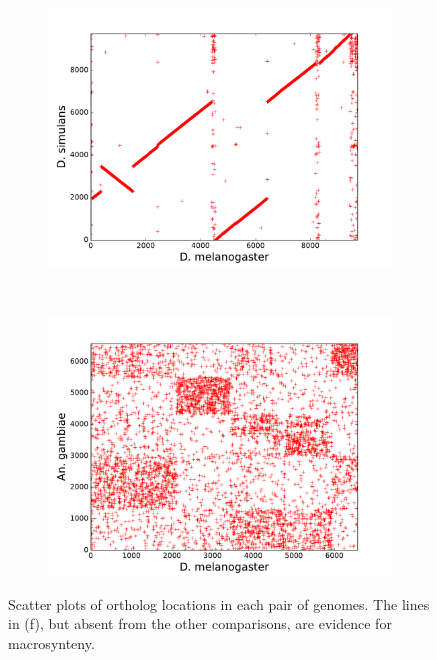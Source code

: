 \begin{figure}[H]
  \ContinuedFloat
  \centering
  \caption{Qualitative Analysis of Macrosynteny (cont).}
  \begin{subfigure}[b]{0.4\textwidth}
    \includegraphics[width=\textwidth]{figures/synteny/dmel_dsim_plot}
    \caption{\label{fig:synteny-dotplots-drosophila}}
  \end{subfigure}
  ~
  \begin{subfigure}[b]{0.4\textwidth}
    \includegraphics[width=\textwidth]{figures/synteny/dmel_anopheles_plot}
    \caption{\label{fig:synteny-dotplots-anopheles-drosophila}}
  \end{subfigure}
  \label{fig:dot-plots}

  Scatter plots of ortholog locations in each pair of genomes. The lines in (f), but absent from the other comparisons, are evidence for macrosynteny.
\end{figure}

